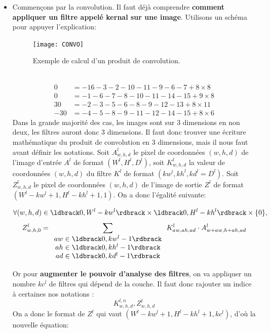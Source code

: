 \documentclass[12pt,a4paper]{extarticle}
\begin{document}
\begin{itemize}
\item Commençons par la convolution. Il faut déjà comprendre \textbf{comment appliquer un filtre appelé kernal sur une image}. Utilisons un schéma pour appuyer l'explication:
\begin{figure}[h]
\centering
\texttt{[image: CONVO]}
\caption{Exemple de calcul d'un produit de convolution.}
\end{figure}\\
\begin{align}
0&=-16-3-2-10-11-9-6-7+8\times 8 \\
0&=-1-6-7-8-10-11-14-15+9\times 8 \\
30&=-2-3-5-6-8-9-12-13+8\times 11 \\
-30&=-4-5-8-9-11-12-14-15+8\times 6 
\end{align}
Dans la grande majorité des cas, les images sont sur 3 dimensions en non deux, les filtres auront donc 3 dimensions. Il faut donc trouver une écriture mathématique du produit de convolution en 3 dimensions, mais il nous faut avant définir les notations. Soit $A^l_{w,h,d}$ le pixel de coordonnées $(w,h,d)$ de l'image d'entrée $A^l$ de format $(W^l,H^l,D^l)$, soit $K^l_{w,h,d}$ la valeur de coordonnées $(w,h,d)$ du filtre $K^l$ de format $(kw^l,kh^l, kd^l=D^l)$. Soit $Z^l_{w,h,d}$ le pixel de coordonnées $(w,h,d)$ de l'image de sortie $Z^l$ de format $(W^l-kw^l+1, H^l-kh^l+1, 1)$. On a donc l'égalité suivante:
 

\[ \forall (w,h,d)\in \ldbrack 0,W^l-kw^l\rdbrack \times \ldbrack 0, H^l-kh^l\rdbrack \times \{0\},\]
\[ Z^l_{w,h,0}= \sum_{\begin{array}{c} aw\in \ldbrack 0, kw^l-1\rdbrack \\ ah\in \ldbrack 0, kh^l-1\rdbrack \\ ad\in \ldbrack0,kd^l-1\rdbrack \end{array}}K^l_{aw,ah,ad}\cdot A^l_{w+aw,h+ah,ad} \]

Or pour \textbf{augmenter le pouvoir d'analyse des filtres}, on va appliquer un nombre $kc^l$ de filtres qui dépend de la couche. Il faut donc rajouter un indice à certaines nos notations :
\[K^{l,n}_{w,h,d}, Z^{l}_{w,h,d}\]
On a donc le format de $Z^{l}$ qui vaut $(W^l-kw^l+1, H^l-kh^l+1, kc^l)$, d'où la nouvelle équation:


\end{itemize}
\end{document}

